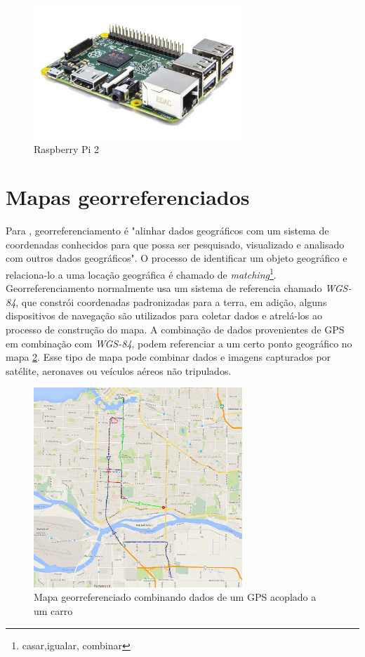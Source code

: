 \begin{figure}[H]
    \centering
    \includegraphics[width=0.7\textwidth]{figuras/raspberrypi2.jpg}
    \caption{Raspberry Pi 2}
    \label{fig:raspberry-pi}
\end{figure}

\section{Mapas georreferenciados}
Para \cite{Meng2014}, georreferenciamento é "alinhar dados geográficos com um sistema de coordenadas conhecidos para que possa ser pesquisado, visualizado e analisado com outros dados geográficos". O processo de identificar um objeto geográfico e relaciona-lo a uma locação geográfica é chamado de \textit{matching}\footnote{casar,igualar, combinar}. Georreferenciamento  normalmente usa um sistema de referencia chamado \textit{WGS-84}, que constrói coordenadas padronizadas para a terra, em adição, alguns dispositivos de navegação são utilizados para coletar dados e atrelá-los ao processo de construção do mapa. A combinação de dados provenientes de GPS em combinação com \textit{WGS-84}, podem referenciar a um certo ponto geográfico no mapa \ref{fig:mapa:georef}. Esse tipo de mapa pode combinar dados e imagens capturados por satélite, aeronaves ou veículos aéreos não tripulados. 

\begin{figure}[H]
    \centering
    \includegraphics[width=0.7\textwidth]{figuras/Screen Shot 2016-05-12 at 3.25.21 PM.png}
    \caption{Mapa georreferenciado combinando dados de um GPS acoplado a um carro}
    \label{fig:mapa:georef}
\end{figure}

